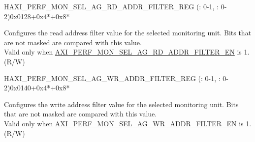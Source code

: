 \begin{register}{H}{AXI\_PERF\_MON\_SEL\_AG\_RD\_ADDR\_FILTER\_REG (: 0-1, : 0-2)}{0x0128+0x4*+0x8*}\label{regdesc:AXIPERFMONSELAGNRDADDRFILTERMREG}
%
\regnewline%
\begin{regdesc}\begin{reglist}
\label{fielddesc:AXIPERFMONSELAGNRDADDRFILTERM}\item [AXI\_PERF\_MON\_SEL\_AG\regindex{n}\_RD\_ADDR\_FILTER\regindex{m} (\regindex{n}: 0-1, \regindex{m}: 0-2)] Configures the read address filter value for the selected monitoring unit. Bits that are not masked are compared with this value.\\
Valid only when \hyperref[fielddesc:AXIPERFMONSELAGNRDADDRFILTEREN]{AXI\_PERF\_MON\_SEL\_AG\_RD\_ADDR\_FILTER\_EN}  is 1.\\
(R/W)
\end{reglist}\end{regdesc}
\end{register}


\begin{register}{H}{AXI\_PERF\_MON\_SEL\_AG\_WR\_ADDR\_FILTER\_REG (: 0-1, : 0-2)}{0x0140+0x4*+0x8*}\label{regdesc:AXIPERFMONSELAGNWRADDRFILTERMREG}
%
\regnewline%
\begin{regdesc}\begin{reglist}
\label{fielddesc:AXIPERFMONSELAGNWRADDRFILTERM}\item [AXI\_PERF\_MON\_SEL\_AG\regindex{n}\_WR\_ADDR\_FILTER\regindex{m} (\regindex{n}: 0-1, \regindex{m}: 0-2)] Configures the write address filter value for the selected monitoring unit. Bits that are not masked are compared with this value.\\
Valid only when \hyperref[fielddesc:AXIPERFMONSELAGNWRADDRFILTEREN]{AXI\_PERF\_MON\_SEL\_AG\_WR\_ADDR\_FILTER\_EN} is 1.\\
(R/W)
\end{reglist}\end{regdesc}
\end{register}


